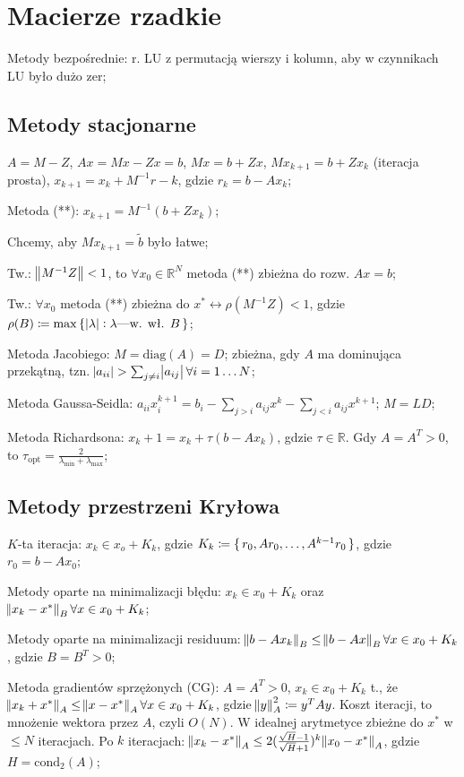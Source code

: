 \section{Macierze rzadkie}

\entry
Metody bezpośrednie: r. LU z permutacją wierszy i kolumn, aby w czynnikach LU było dużo zer;


\subsection{Metody stacjonarne}

\entry
$A=M-Z$, $Ax=Mx-Zx=b$, $Mx=b+Zx$, $Mx_{k+1}=b+Zx_{k}$ (iteracja prosta), $x_{k+1}=x_k+M^{-1}r-k$, gdzie $r_k=b-Ax_k$;

\entry
Metoda (**): $x_{k+1}=M^{-1}(b+Zx_k)$;

\entry
Chcemy, aby $Mx_{k+1}=\tilde{b}$ było łatwe;

\entry
Tw.: $\norm{M^{-1}Z} < 1$, to $\forall x_0 \in \mathbb{R}^N$ metoda (**) zbieżna do rozw. $Ax=b$;

\entry
Tw.: $\forall x_0$ metoda (**) zbieżna do $x^* \leftrightarrow \rho(M^{-1}Z) < 1$, gdzie $\rho(B) \coloneqq \max\set{\abs{\lambda} : \lambda\text{---w. wł. } B}$;

\entry
Metoda Jacobiego: $M=\mathrm{diag}(A) = D$; zbieżna, gdy $A$ ma dominująca przekątną, tzn. $\abs{a_{ii}} > \sum_{j\neq i}\abs{a_{ij}} \forall i=1\ldots N$;

\entry
Metoda Gaussa-Seidla: $a_{ii}x_i^{k+1}=b_i-\sum_{j>i}a_{ij}x^k-\sum_{j<i}a_{ij}x^{k+1}$; $M = LD$;

\entry
Metoda Richardsona:
$x_k+1 = x_k + \tau(b-Ax_k)$, gdzie $\tau\in\mathbb{R}$.
Gdy $A=A^T>0$, to $\tau_{\mathrm{opt}}=\frac{2}{\lambda_{\mathrm{min}} + \lambda_{\mathrm{max}} }$;

\subsection{Metody przestrzeni Kryłowa}

\entry
$K$-ta iteracja: $x_k\in x_o+K_k$, gdzie $K_k\coloneqq \set{r_0, Ar_0,\ldots, A^{k-1}r_0}$, gdzie $r_0=b-Ax_0$;

\entry
Metody oparte na minimalizacji błędu: $x_k\in x_0 +K_k$ oraz $\norm{x_k - x^*}_B \forall x\in x_0 + K_k$;

\entry
Metody oparte na minimalizacji residuum: $\norm{b-Ax_k}_B \leq \norm{b-Ax}_B \forall x\in x_0 +K_k$, gdzie $B=B^T>0$;

\entry
Metoda gradientów sprzężonych (CG):
$A=A^T>0$, $x_k\in x_0 + K_k$ t., że $\norm{x_k+x^*}_A\leq \norm{x-x^*}_A \forall x\in x_0 + K_k$, gdzie $\norm{y}^2_A \coloneqq y^TAy$.
Koszt iteracji, to mnożenie wektora przez $A$, czyli $O(N)$.
W idealnej arytmetyce zbieżne do $x^*$ w $\leq N$ iteracjach.
Po $k$ iteracjach: $\norm{x_k - x^*}_A\leq 2(\frac{\sqrt{H} - 1}{\sqrt{H} + 1})^k\norm{x_0-x^*}_A$, gdzie $H=\mathrm{cond}_2(A)$;

